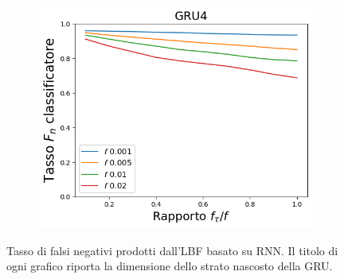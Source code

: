 \documentclass[../../main.tex]{subfiles}
\begin{document}
\begin{figure}[H]
\begin{subfigure}[b]{0.49\textwidth}
            \label{fig:LBFFNR_GRU8}
        \end{subfigure}
        \begin{subfigure}[b]{0.49\textwidth}
            \centering
            \includegraphics[width = \textwidth]{immagini/7/LBF/GRU4_FNR.png}
            \caption{}
            \label{fig:LBFFNR_GRU4}
        \end{subfigure}
        \caption{Tasso di falsi negativi prodotti dall'LBF basato su RNN. Il titolo di ogni grafico riporta la dimensione dello strato nascosto della GRU.}
        \label{fig:GRU_LBFFNR}
    \end{figure}
\end{document}

